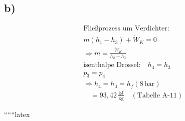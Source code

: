 

\subsection*{b)}

\begin{align*}
    &\text{Fließprozess um Verdichter:} \\
    &m (h_1 - h_3) + \dot{W}_K = 0 \\
    &\Rightarrow \dot{m} = \frac{\dot{W}_K}{h_2 - h_3} \\
    &\text{isenthalpe Drossel:} \quad h_4 = h_3 \\
    &p_3 = p_4 \\
    &\Rightarrow h_4 = h_3 = h_f (8 \, \text{bar}) \\
    &\quad = 93,42 \, \frac{\text{kJ}}{\text{kg}} \quad (\text{Tabelle A-11})
\end{align*}

``````latex